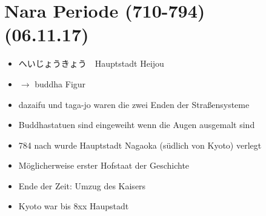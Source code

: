 \documentclass[emulatestandardclasses]{scrartcl}
\begin{document}
\section{Nara Periode (710-794)\\(06.11.17)}

\begin{itemize}
  \item へいじょうきょう　Hauptstadt Heijou
  \item $\rightarrow$ buddha Figur
  \item dazaifu und taga-jo waren die zwei Enden der Straßensysteme
  \item Buddhastatuen sind eingeweiht wenn die Augen ausgemalt sind
  \item 784 nach wurde Hauptstadt Nagaoka (südlich von Kyoto) verlegt
  \item Möglicherweise erster Hofstaat der Geschichte
  \item Ende der Zeit: Umzug des Kaisers
  \item Kyoto war bis 8xx Haupstadt
\end{itemize}



\newpage
\end{document}
